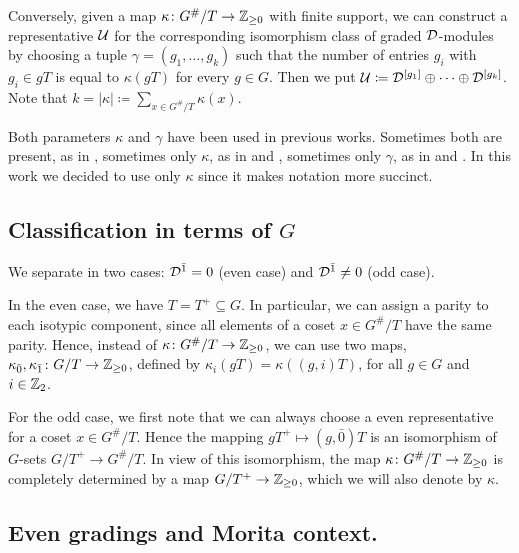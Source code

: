 Conversely, given a map $\kappa\colon G^\#/T \to \mathbb{Z}_{\geq 0}$ with finite support, we can construct a representative $\mathcal U$ for the corresponding isomorphism class of graded $\mathcal{D}$-modules by choosing a tuple $\gamma = (g_1, \ldots, g_k)$ such that the number of entries $g_i$ with $g_i\in gT$ is equal to $\kappa (gT)$ for every $g\in G$. 
Then we put $\mathcal U \coloneqq \mathcal{D}^{[g_1]} \oplus \cdots \oplus \mathcal{D}^{[g_k]}$. 
Note that $k = |\kappa| \coloneqq \sum_{x\in G^\#/T} \kappa(x)$.

\begin{remark}
    Both parameters $\kappa$ and $\gamma$ have been used in previous works. 
    Sometimes both are present, as in \cite{livromicha}, sometimes only $\kappa$, as in \cite{paper-adrian} and \cite{felipe-misha}, sometimes only $\gamma$, as in \cite{paper-Qn} and \cite{paper-MAP}. 
    In this work we decided to use only $\kappa$ since it makes notation more succinct.
\end{remark}

\subsection{Classification in terms of $G$}

We separate in two cases: $\mathcal{D}^{\bar1} = 0$ (even case) and $\mathcal{D}^{\bar1} \neq 0$ (odd case). 

In the even case, we have $T = T^+ \subseteq G$. 
In particular, we can assign a parity to each isotypic component, since all elements of a coset $x \in G^\#/T$ have the same parity. 
Hence, instead of $\kappa\colon G^\#/T \to \mathbb{Z}_{\geq 0}$, we can use two maps, $\kappa_{\bar 0}, \kappa_{\bar 1}\colon G/T \to \mathbb{Z}_{\geq 0}$, defined by $\kappa_i ( gT ) = \kappa ( (g,i)T )$, for all $g\in G$ and $i \in \mathbb{Z}_2$.

For the odd case, we first note that we can always choose a even representative for a coset $x \in G^\#/T$. 
Hence the mapping $g T^+ \mapsto (g, \bar 0) T$ is an isomorphism of $G$-sets $G/T^+ \to G^\#/T$. 
In view of this isomorphism, the map $\kappa\colon G^\#/T \to \mathbb{Z}_{\geq 0}$ is completely determined by a map $G/T^+ \to \mathbb{Z}_{\geq 0}$, which we will also denote by $\kappa$.

\subsection{Even gradings and Morita context.}\label{subsec:even-gradings}

